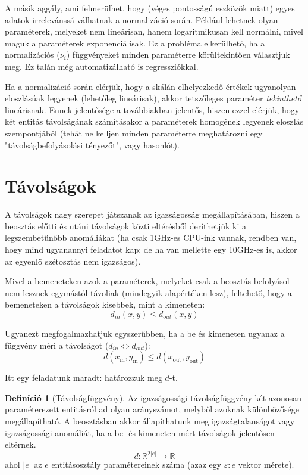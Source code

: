 \documentclass{article}
\theoremstyle{definition}
\newtheorem{definition}{Definíció}[section]
\newcommand{\subin}[1]{ {#1}_{\text{in}} }
\newcommand{\subout}[1]{ {#1}_{\text{out}} }
\begin{document}
\begin{multicols}{2}
    A másik aggály, ami felmerülhet, hogy (véges pontosságú eszközök miatt) egyes adatok irrelevánssá válhatnak a normalizáció során. Például lehetnek olyan paraméterek, melyeket nem lineárisan, hanem logaritmikusan kell normálni, mivel maguk a paraméterek exponenciálisak. Ez a probléma elkerülhető, ha a normalizációs ($\nu_i$) függvényeket minden paraméterre körültekintően választjuk meg. Ez talán még automatizálható is regressziókkal.
    
    Ha a normalizáció során elérjük, hogy a skálán elhelyezkedő értékek ugyanolyan eloszlásúak legyenek (lehetőleg lineárisak), akkor tetszőleges paraméter {\it tekinthető} lineárisnak. Ennek jelentősége a továbbiakban jelentős, hiszen ezzel elérjük, hogy két entitás távolságának számításakor a paraméterek homogének legyenek eloszlás szempontjából (tehát ne kelljen minden paraméterre meghatározni egy "távolságbefolyásolási tényezőt", vagy hasonlót).
    
\section{Távolságok}    
    
    A távolságok nagy szerepet játszanak az igazságosság megállapításában, hiszen a beosztás előtti és utáni távolságok közti eltérésből deríthetjük ki a legszembetűnőbb anomáliákat (ha csak 1GHz-es CPU-ink vannak, rendben van, hogy mind ugyanannyi feladatot kap; de ha van mellette egy 10GHz-es is, akkor az egyenlő szétosztás nem igazságos).
    
    Mivel a bemeneteken azok a paraméterek, melyeket csak a beosztás befolyásol nem lesznek egymástól távoliak (mindegyik alapértéken lesz), feltehető, hogy a bemeneteken a távolságok kisebbek, mint a kimeneten:
    $$ d_{in}(x, y) \leq d_{out}(x, y) $$
    
    Ugyanezt megfogalmazhatjuk egyszerűbben, ha a be és kimeneten ugyanaz a függvény méri a távolságot ($d_{in} \Leftrightarrow d_{out}$):
    \begin{equation}
        d(\subin{x}, \subin{y}) \leq d(\subout{x}, \subout{y})
    \end{equation}
    
    Itt egy feladatunk maradt: határozzuk meg $d$-t.
    
    \begin{definition}[Távolságfüggvény]
        Az igazságossági távolságfüggvény két azonosan paraméterezett entitásról ad olyan arányszámot, melyből azoknak különbözősége megállapítható. A beosztásban akkor állapíthatunk meg igazságtalanságot vagy igazságossági anomáliát, ha a be- és kimeneten mért távolságok jelentősen eltérnek.
        \begin{equation}
            d: \mathbb{R}^{2|e|} \to \mathbb{R}
        \end{equation}
        ahol $|e|$ az $e$ entitásosztály paramétereinek száma (azaz egy $\varepsilon : e$ vektor mérete).
    \end{definition}
    

\end{multicols}
\end{document}
